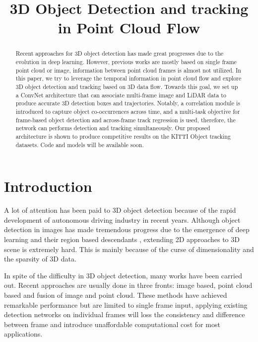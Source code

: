 \documentclass{bmvc2k}
\title{3D Object Detection and tracking in Point Cloud Flow}
\begin{document}
\maketitle

\begin{abstract}
Recent approaches for 3D object detection has made great progresses due to the evolution in deep learning. However, previous works are mostly based on single frame point cloud or image, information between point cloud frames is almost not utilized. In this paper, we try to leverage the temporal information in point cloud flow and explore 3D object detection and tracking based on 3D data flow. Towards this goal, we set up a ConvNet architecture that can associate multi-frame image and LiDAR data to produce accurate 3D detection boxes and trajectories. Notably, a correlation module is introduced to capture object co-occurrences across time, and a multi-task objective for frame-based object detection and across-frame track regression is used, therefore, the network can performs detection and tracking simultaneously. Our proposed architecture is shown to produce competitive results on the KITTI Object tracking datasets. Code and models will be available soon.
\end{abstract}

\section{Introduction}
\label{sec:intro}
A lot of attention has been paid to 3D object detection because of the rapid development of  autonomous driving industry in recent years. Although object detection in images has made tremendous progress due to the emergence of deep learning \cite{krizhevsky2012imagenet, simonyan2014very, he2016deep} and their region based descendants \cite{dai2016r, girshick2015fast, ren2015faster}, extending 2D approaches to 3D scene is extremely hard. This is mainly because of the curse of dimensionality and the sparsity of 3D data. 

In spite of the difficulty in 3D object detection, many works have been carried out. Recent approaches are usually done in three fronts: image based, point cloud based and fusion of image and point cloud. These methods have achieved remarkable performance but are limited to single frame input, applying existing detection networks on individual frames will loss the consistency and difference between frame and introduce unaffordable computational cost for most applications.
\end{document}
